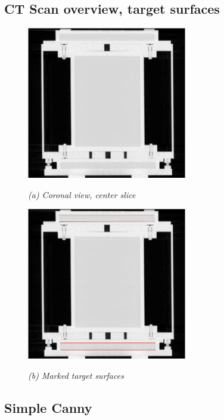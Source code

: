 
\subsection{CT Scan overview, target surfaces}
\begin{figure}[htb]
  \begin{minipage}[t]{2.75in}
    \centering
    \centerline{\mbox{\includegraphics[width=2.75in]{data_extraction/images/ct_coronal_mid_slice.eps}}}
    \centerline{\emph{(a) Coronal view, center slice}}
  \end{minipage}\medskip
  \begin{minipage}[t]{2.75in}
    \centering
    \centerline{\mbox{\includegraphics[width=2.75in]{data_extraction/images/ct_coronal_mid_slice_marked_surface.eps}}}
    \centerline{\emph{(b) Marked target surfaces}}
  \end{minipage}
\end{figure}

\subsection{Simple Canny}


